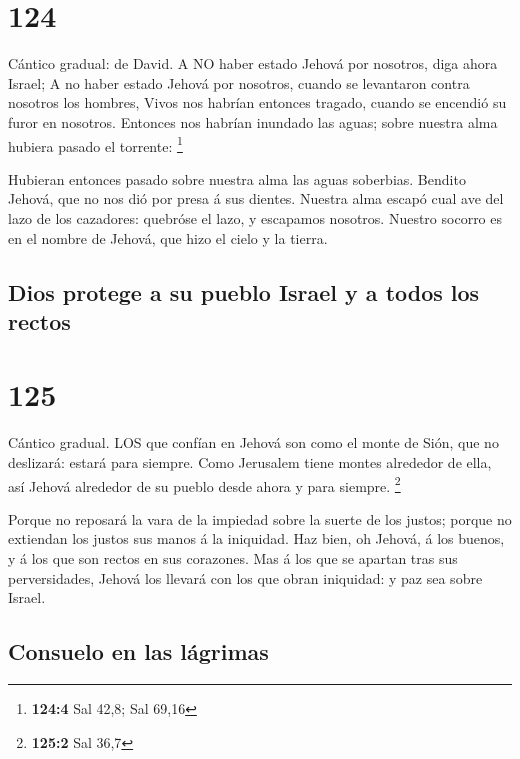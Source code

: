 \hypertarget{section-123}{%
\section{124}\label{section-123}}

 Cántico gradual: de David. A NO haber estado Jehová por
nosotros, diga ahora Israel;  A no haber estado Jehová por
nosotros, cuando se levantaron contra nosotros los hombres, 
Vivos nos habrían entonces tragado, cuando se encendió su furor en
nosotros.  Entonces nos habrían inundado las aguas; sobre
nuestra alma hubiera pasado el torrente: \footnote{\textbf{124:4} Sal
  42,8; Sal 69,16}

 Hubieran entonces pasado sobre nuestra alma las aguas
soberbias.  Bendito Jehová, que no nos dió por presa á sus
dientes.  Nuestra alma escapó cual ave del lazo de los
cazadores: quebróse el lazo, y escapamos nosotros.  Nuestro
socorro es en el nombre de Jehová, que hizo el cielo y la tierra.

\hypertarget{dios-protege-a-su-pueblo-israel-y-a-todos-los-rectos}{%
\subsection{Dios protege a su pueblo Israel y a todos los
rectos}\label{dios-protege-a-su-pueblo-israel-y-a-todos-los-rectos}}

\hypertarget{section-124}{%
\section{125}\label{section-124}}

 Cántico gradual. LOS que confían en Jehová son como el
monte de Sión, que no deslizará: estará para siempre.  Como
Jerusalem tiene montes alrededor de ella, así Jehová alrededor de su
pueblo desde ahora y para siempre. \footnote{\textbf{125:2} Sal 36,7}

 Porque no reposará la vara de la impiedad sobre la suerte
de los justos; porque no extiendan los justos sus manos á la iniquidad.
 Haz bien, oh Jehová, á los buenos, y á los que son rectos
en sus corazones.  Mas á los que se apartan tras sus
perversidades, Jehová los llevará con los que obran iniquidad: y paz sea
sobre Israel.

\hypertarget{consuelo-en-las-luxe1grimas}{%
\subsection{Consuelo en las
lágrimas}\label{consuelo-en-las-luxe1grimas}}

